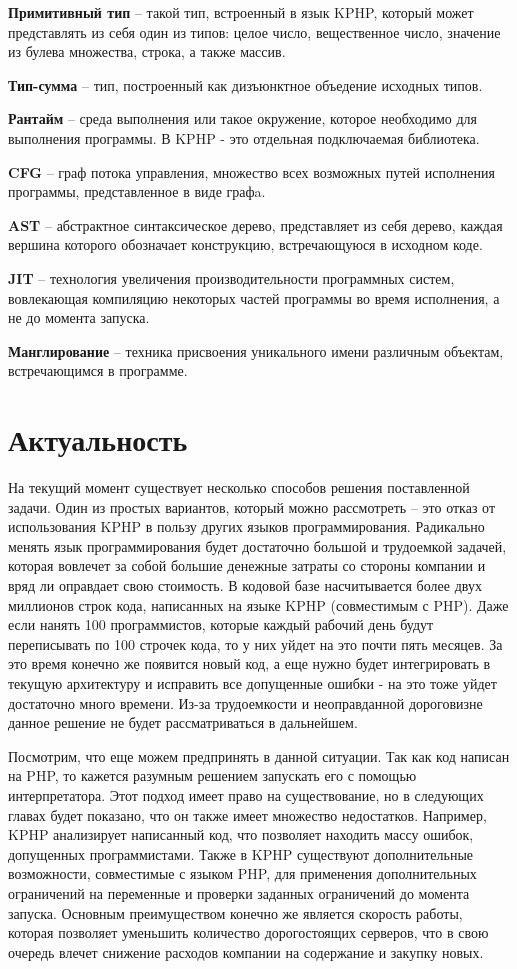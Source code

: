 \textbf{Примитивный тип} -- такой тип, встроенный в язык KPHP, который может представлять из себя один из типов: целое число, вещественное число, значение из булева множества, строка, а также массив.

\textbf{Тип-сумма} -- тип, построенный как дизъюнктное объедение исходных типов.

\textbf{Рантайм} -- среда выполнения или такое окружение, которое необходимо для выполнения программы. В KPHP - это отдельная подключаемая библиотека.

\textbf{CFG} -- граф потока управления, множество всех возможных путей исполнения программы, представленное в виде графa.

\textbf{AST} -- абстрактное синтаксическое дерево, представляет из себя дерево, каждая вершина которого обозначает конструкцию, встречающуюся в исходном коде.

\textbf{JIT} -- технология увеличения производительности программных систем, вовлекающая компиляцию некоторых частей программы во время исполнения, а не до момента запуска.

\textbf{Манглирование} -- техника присвоения уникального имени различным объектам, встречающимся в программе.

\section{Актуальность}
\label{sec:actuality}
На текущий момент существует несколько способов решения поставленной задачи.
Один из простых вариантов, который можно рассмотреть -- это отказ от использования KPHP в пользу других языков программирования.
Радикально менять язык программирования будет достаточно большой и трудоемкой задачей, которая вовлечет за собой большие денежные затраты со стороны компании и вряд ли оправдает свою стоимость.
В кодовой базе насчитывается более двух миллионов строк кода, написанных на языке KPHP (совместимым с PHP).
Даже если нанять 100 программистов, которые каждый рабочий день будут переписывать по 100 строчек кода, то у них уйдет на это почти пять месяцев. За это время конечно же появится новый код, а еще нужно будет интегрировать в текущую архитектуру и исправить все допущенные ошибки - на это тоже уйдет достаточно много времени.
Из-за трудоемкости и неоправданной дороговизне данное решение не будет рассматриваться в дальнейшем.

Посмотрим, что еще можем предпринять в данной ситуации. 
Так как код написан на PHP, то кажется разумным решением запускать его с помощью интерпретатора.
Этот подход имеет право на существование, но в следующих главах будет показано, что он также имеет множество недостатков.
Например, KPHP анализирует написанный код, что позволяет находить массу ошибок, допущенных программистами.
Также в KPHP существуют дополнительные возможности, совместимые с языком PHP, для применения дополнительных ограничений на переменные и проверки заданных ограничений до момента запуска.
Основным преимуществом конечно же является скорость работы, которая позволяет уменьшить количество дорогостоящих серверов, что в свою очередь влечет снижение расходов компании на содержание и закупку новых.

